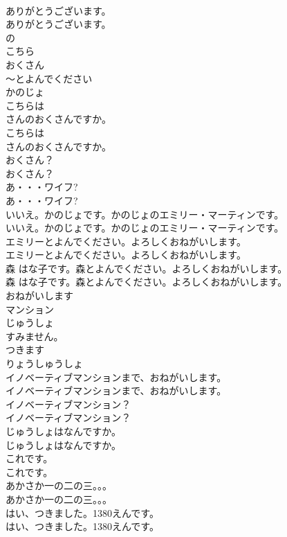 \documentclass[8pt]{extreport}
\begin{document}
\begin{CJK}{UTF8}{min}
\\	ありがとうございます。	
\\	ありがとうございます。 
\\	の
\\	こちら
\\	おくさん
\\	～とよんでください
\\	かのじょ
\\	こちらは
\\	さんのおくさんですか。	
\\	こちらは
\\	さんのおくさんですか。 
\\	おくさん？	
\\	おくさん？ 
\\	あ・・・ワイフ?	
\\	あ・・・ワイフ? 
\\	いいえ。かのじょです。かのじょのエミリー・マーティンです。	
\\	いいえ。かのじょです。かのじょのエミリー・マーティンです。 
\\	エミリーとよんでください。よろしくおねがいします。	
\\	エミリーとよんでください。よろしくおねがいします。 
\\	森 はな子です。森とよんでください。よろしくおねがいします。	
\\	森 はな子です。森とよんでください。よろしくおねがいします。 
\\	おねがいします
\\	マンション
\\	じゅうしょ
\\	すみません。
\\	つきます
\\	りょうしゅうしょ
\\	イノベーティブマンションまで、おねがいします。	
\\	イノベーティブマンションまで、おねがいします。 
\\	イノベーティブマンション？	
\\	イノベーティブマンション？ 
\\	じゅうしょはなんですか。	
\\	じゅうしょはなんですか。 
\\	これです。
\\	これです。
\\	あかさか一の二の三。。。	
\\	あかさか一の二の三。。。 
\\	はい、つきました。1380えんです。	
\\	はい、つきました。1380えんです。 

\end{CJK}
\end{document}
